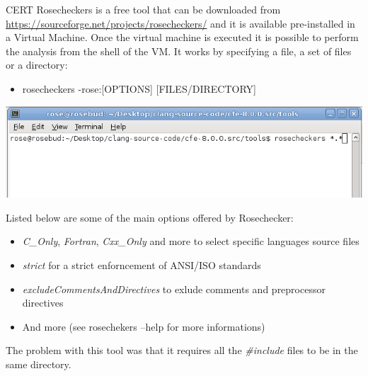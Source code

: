 CERT Rosecheckers is a free tool that can be downloaded from \url{https://sourceforge.net/projects/rosecheckers/} and it is available pre-installed in a Virtual Machine.\newline
Once the virtual machine is executed it is possible to perform the analysis from the shell of the VM. It works by specifying a file, a set of files or a directory:

\begin{itemize}
	\item rosecheckers -rose:[OPTIONS] [FILES/DIRECTORY]
\end{itemize}

\begin{minipage}{\linewidth}
\includegraphics[width=\textwidth]{img/rosechecker-commandline.png}
\end{minipage}
\pagebreak

Listed below are some of the main options offered by Rosechecker:

\begin{itemize}
	\item \textsl{C\_Only}, \textsl{Fortran}, \textsl{Cxx\_Only} and more to select specific languages source files
	\item \textsl{strict} for a strict enforncement of ANSI/ISO standards
	\item \textsl{excludeCommentsAndDirectives} to exlude comments and preprocessor directives
	\item And more (see rosechekers --help for more informations)
\end{itemize}

The problem with this tool was that it requires all the \textsl{\#include} files to be in the same directory.\newline\newline

